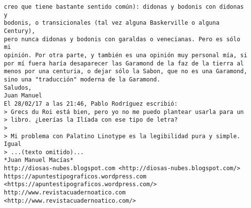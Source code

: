 \documentclass[a4paper,10pt]{article}
\begin{document}
\begin{lstlisting}
creo que tiene bastante sentido común): didonas y bodonis con didonas y 
bodonis, o transicionales (tal vez alguna Baskerville o alguna Century), 
pero nunca didonas y bodonis con garaldas o venecianas. Pero es sólo mi 
opinión. Por otra parte, y también es una opinión muy personal mía, si 
por mí fuera haría desaparecer las Garamond de la faz de la tierra al 
menos por una centuria, o dejar sólo la Sabon, que no es una Garamond, 
sino una "traducción" moderna de la Garamond.
Saludos,
Juan Manuel
El 28/02/17 a las 21:46, Pablo Rodríguez escribió:
> Grecs du Roi está bien, pero yo no me puedo plantear usarla para un
> libro. ¿Leerías la Ilíada con ese tipo de letra?
>
> Mi problema con Palatino Linotype es la legibilidad pura y simple. Igual
> ...(texto omitido)...
*Juan Manuel Macías*
http://diosas-nubes.blogspot.com <http://diosas-nubes.blogspot.com/>
https://apuntestipograficos.wordpress.com 
<https://apuntestipograficos.wordpress.com/>
http://www.revistacuadernoatico.com <http://www.revistacuadernoatico.com/>

\end{lstlisting}
\end{document}
